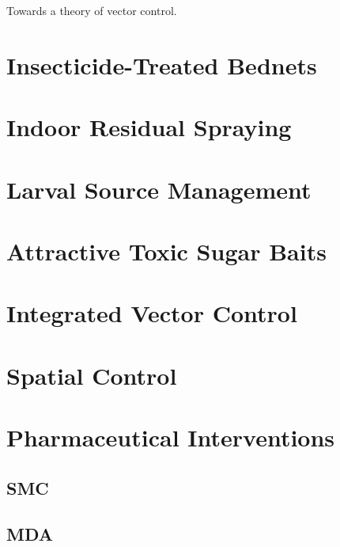 \documentclass[
]{book}
\begin{document}
Towards a theory of vector control.

\hypertarget{insecticide-treated-bednets}{%
\chapter{Insecticide-Treated Bednets}\label{insecticide-treated-bednets}}

\hypertarget{indoor-residual-spraying}{%
\chapter{Indoor Residual Spraying}\label{indoor-residual-spraying}}

\hypertarget{larval-source-management}{%
\chapter{Larval Source Management}\label{larval-source-management}}

\hypertarget{attractive-toxic-sugar-baits}{%
\chapter{Attractive Toxic Sugar Baits}\label{attractive-toxic-sugar-baits}}

\hypertarget{integrated-vector-control-1}{%
\chapter{Integrated Vector Control}\label{integrated-vector-control-1}}

\hypertarget{spatial-control}{%
\chapter{Spatial Control}\label{spatial-control}}

\hypertarget{pharmaceutical-interventions-1}{%
\chapter{Pharmaceutical Interventions}\label{pharmaceutical-interventions-1}}

\hypertarget{smc-1}{%
\section{SMC}\label{smc-1}}

\hypertarget{mda-1}{%
\section{MDA}\label{mda-1}}
\end{document}
